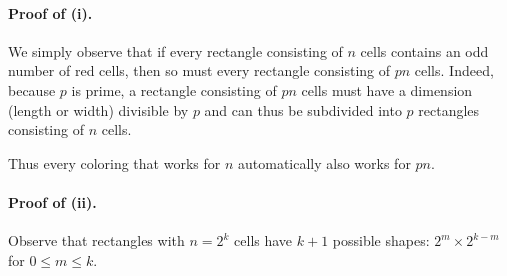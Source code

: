 \documentclass[11pt]{scrartcl}
\begin{document}
\paragraph{Proof of (i).}
We simply observe that if every rectangle consisting of $n$ cells contains an
odd number of red cells, then so must every rectangle consisting of $pn$ cells.
Indeed, because $p$ is prime, a rectangle consisting of $pn$ cells must have a
dimension (length or width) divisible by $p$ and can thus be subdivided
into $p$ rectangles consisting of $n$ cells.

Thus every coloring that works for $n$ automatically also works for $pn$.

\paragraph{Proof of (ii).}
Observe that rectangles with $n=2^k$ cells have $k+1$ possible shapes:
$2^m\times 2^{k-m}$ for $0\leq m \leq k$.
\end{document}
